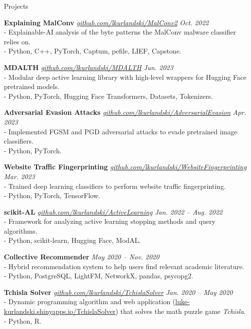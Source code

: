 \documentclass{cv} %
\newif\ifextras \extrasfalse %
\begin{document}
\ifextras
\begin{rSection}{Projects}

	{\bf Explaining MalConv} {\small \textit{\url{github.com/lkurlandski/MalConv2}}} \hfill {\em Oct. 2022}
	\\- Explainable-AI analysis of the byte patterns the MalConv malware classifier relies on.
	\\- Python, C++, PyTorch, Captum, pefile, LIEF, Capstone.

	{\bf MDALTH} {\small \textit{\url{github.com/lkurlandski/MDALTH}}} \hfill {\em Jun. 2023}
	\\- Modular deep active learning library with high-level wrappers for Hugging Face pretrained models.
	\\- Python, PyTorch, Hugging Face Transformers, Datasets, Tokenizers.

	{\bf Adversarial Evasion Attacks} {\small \textit{\url{github.com/lkurlandski/AdversarialEvasion}}} \hfill {\em Apr. 2023}
	\\- Implemented FGSM and PGD adversarial attacks to evade pretrained image classifiers.
	\\- Python, PyTorch.

	{\bf Website Traffic Fingerprinting} {\small \textit{\url{github.com/lkurlandski/WebsiteFingerprinting}}} \hfill {\em Mar. 2023}
	\\- Trained deep learning classifiers to perform website traffic fingerprinting.
	\\- Python, PyTorch, TensorFlow.

	{\bf scikit-AL} {\small \textit{\url{github.com/lkurlandski/ActiveLearning}}} \hfill {\em Jan. 2022 -- Aug. 2022}
	\\- Framework for analyzing active learning stopping methods and query algorithms.
	\\- Python, scikit-learn, Hugging Face, ModAL.

	{\bf Collective Recommender} \hfill {\em May 2020 -- Nov. 2020}
	\\- Hybrid recommendation system to help users find relevant academic literature.
	\\- Python, PostgreSQL, LightFM, NetworkX, pandas, psycopg2.

	{\bf Tchisla Solver} {\small \textit{\url{github.com/lkurlandski/TchislaSolver}}} \hfill {\em Jan. 2020 -- May 2020}
	\\- Dynamic programming algorithm and web application (\url{luke-kurlandski.shinyapps.io/TchislaSolver}) that solves the math puzzle game \textit{Tchisla}.
	\\- Python, R.


\end{rSection}
\end{document}
